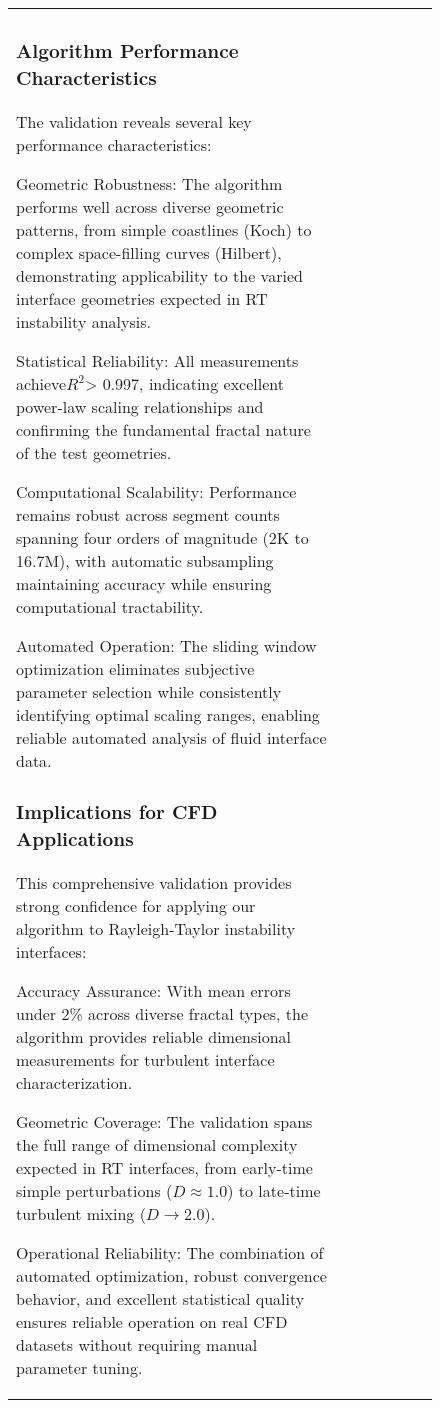 \documentclass[preprint,12pt]{elsarticle}
\def\textbf#1{#1}%
\begin{document}
\begin{figure}[ht]
\begin{table}[ht]
\begin{tabular}{|l|c|c|c|c|c|c|}
\subsubsection{Algorithm Performance Characteristics}

The validation reveals several key performance characteristics:

\textbf{Geometric Robustness}: The algorithm performs well across diverse geometric patterns, from simple coastlines (Koch) to complex space-filling curves (Hilbert), demonstrating applicability to the varied interface geometries expected in RT instability analysis.

\textbf{Statistical Reliability}: All measurements achieve$R^2$> 0.997, indicating excellent power-law scaling relationships and confirming the fundamental fractal nature of the test geometries.

\textbf{Computational Scalability}: Performance remains robust across segment counts spanning four orders of magnitude (2K to 16.7M), with automatic subsampling maintaining accuracy while ensuring computational tractability.

\textbf{Automated Operation}: The sliding window optimization eliminates subjective parameter selection while consistently identifying optimal scaling ranges, enabling reliable automated analysis of fluid interface data.

\subsubsection{Implications for CFD Applications}

This comprehensive validation provides strong confidence for applying our algorithm to Rayleigh-Taylor instability interfaces:

\textbf{Accuracy Assurance}: With mean errors under 2\% across diverse fractal types, the algorithm provides reliable dimensional measurements for turbulent interface characterization.

\textbf{Geometric Coverage}: The validation spans the full range of dimensional complexity expected in RT interfaces, from early-time simple perturbations ($D \approx 1.0$) to late-time turbulent mixing ($D \rightarrow 2.0$).

\textbf{Operational Reliability}: The combination of automated optimization, robust convergence behavior, and excellent statistical quality ensures reliable operation on real CFD datasets without requiring manual parameter tuning.


\end{tabular}
\end{table}
\end{figure}
\end{document}
